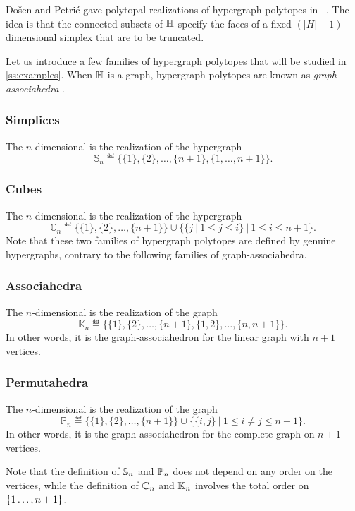 Do\v sen and Petri\'c gave polytopal realizations of hypergraph polytopes in ~\cite{DP-HP}.
The idea is that the connected subsets of ${\mathbb H}$ specify the faces of a fixed $(|H|-1)$-dimensional simplex that are to be truncated.

Let us introduce a few families of hypergraph polytopes that will be studied in \cref{ss:examples}.
When ${\mathbb H}$ is a graph, hypergraph polytopes are known as \emph{graph-associahedra} \cite{CD-CCGA}.

\subsubsection{Simplices}
The $n$-dimensional  is the realization of the hypergraph 
$$\mathbb{S}_n\eqdef  \{\{1\},\{2\},\ldots,\{n+1\},\{1,\ldots,n+1\}\}.$$

\subsubsection{Cubes}
The $n$-dimensional  is the realization of the hypergraph
$$\mathbb{C}_n\eqdef  
\{\{1\},\{2\},\ldots,\{n+1\}\}\cup\{\{j \ | \ 1 \leq j \leq i \} \ | \ 1 \leq i \leq n+1\}.$$
Note that these two families of hypergraph polytopes are defined by genuine hypergraphs, contrary to the following families of graph-associahedra.

\subsubsection{Associahedra}
The $n$-dimensional  is the realization of the graph 
$$\mathbb{K}_n\eqdef  \{\{1\},\{2\},\ldots,\{n+1\},\{1,2\},\ldots,\{n,n+1\}\}.$$
In other words, it is the graph-associahedron for the linear graph with $n+1$ vertices.

\subsubsection{Permutahedra}
The $n$-dimensional  is the realization of the graph 
$$\mathbb{P}_n\eqdef  \{\{1\},\{2\},\ldots,\{n+1\}\} \cup \{\{i,j\} \ | \ 1 \leq i \neq j \leq n+1 \}.$$
In other words, it is the graph-associahedron for the complete graph on $n+1$ vertices.

Note that the definition of ${\mathbb S}_n$ and ${\mathbb P}_n$ does not depend on any order on the vertices, while the definition of ${\mathbb C}_n$ and ${\mathbb K}_n$ involves the total order on~$\left\{1\ldots,n+1\right\}$. 

